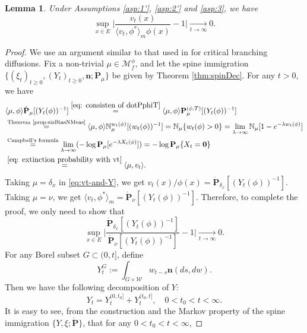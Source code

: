 \documentclass[UTF8]{pkuthss}
\theoremstyle{plain}
\newtheorem{lem}[thm]{Lemma}
\theoremstyle{definition}
\numberwithin{equation}{section}
\begin{document}
\begin{lem}\label{lem:Kolmogorov-1}
	Under Assumptions  \ref{asp:1'}, \ref{asp:2'} and \ref{asp:3}, we have
\[
	\sup_{x\in E}\Big | \frac{v_t(x)}{\langle v_t, \phi^*\rangle_m \phi(x)} - 1\Big |
	\xrightarrow[t\to\infty]{} 0.
\]
\end{lem}
\begin{proof}
	We use an argument similar to that used in \cite{Powell2016An-invariance} for critical branching diffusions.
Fix a non-trivial $\mu \in \mathcal M_f^\phi$, and let the spine
 immigration $\{(\xi_t)_{t\geq 0}, (Y_t)_{t\geq 0}, \mathbf n; \dot {\mathbf P}_\mu\}$ be given by Theorem \ref{thm:spinDec}.
For any $t > 0$, we have
\begin{equation}\label{eq:vt-and-Y}\begin{split}
	&\langle \mu,\phi\rangle \dot {\mathbf P}_\mu [(Y_t(\phi))^{-1}]
	\overset{\eqref{eq: consisten of dotPphiT}}{=}
	\langle \mu,\phi\rangle \mathbf P^{(\phi,T)}_\mu [(Y_t(\phi))^{-1}]
	\\&\overset{\text{Theorem \ref{prop:sizBiasNMeas}}}{=} \langle \mu,\phi\rangle \mathbb N_\mu^{w_t(\phi)} [ (w_t(\phi))^{-1}]
	= \mathbb N_{\mu}\{w_t(\phi)>0\}
	= \lim_{\lambda \to \infty} \mathbb N_\mu[1-e^{-\lambda w_t(\phi)}]
	\\&\overset{\text{Campbell's formula}}{=} \lim_{\lambda \to \infty} (-\log \mathbf P_\mu[e^{-\lambda X_t(\phi)}])
	= -\log \mathbf P_{\mu} \{ X_t = \mathbf 0\} \\
	& \overset{\eqref{eq: extinction probability with vt}}{=} \langle \mu,v_t \rangle.
\end{split}\end{equation}
	Taking $\mu = \delta_x$ in \eqref{eq:vt-and-Y}, we get $v_t(x)/\phi(x)=\dot{\mathbf P}_{\delta_x}[(Y_t(\phi))^{-1}]$.
	Taking $\mu = \nu$, we get $\langle v_t, \phi^*\rangle_m = \dot {\mathbf P}_{\nu} [(Y_t(\phi))^{-1}]$.
	Therefore, to complete the proof, we only need to show that
\[
	\sup_{x\in E}\Big | \frac {\dot{\mathbf P}_{\delta_x}[(Y_t(\phi))^{-1}]} {\dot {\mathbf P}_\nu [(Y_t(\phi))^{-1}]}-1\Big|
	\xrightarrow[t\to\infty]{} 0.
\]
	For any Borel subset $G\subset (0,t]$, define
\[
	Y^G_t
	:= \int_{G\times \mathcal W} w_{t-s} \mathbf n(ds,dw).
\]
	Then we have the following decomposition of $Y$:
\begin{equation}\label{eq:decomposition-on-Y}
	Y_t
	= Y^{(0,t_0]}_t + Y^{(t_0,t]}_t,
	\quad 0 < t_0 < t < \infty.
\end{equation}
	It is easy to see, from the construction and the Markov property of the spine immigration $\{Y,\xi; \dot {\mathbf P}\}$, that for any $0 < t_0 < t < \infty$,

\end{proof}
\end{document}
